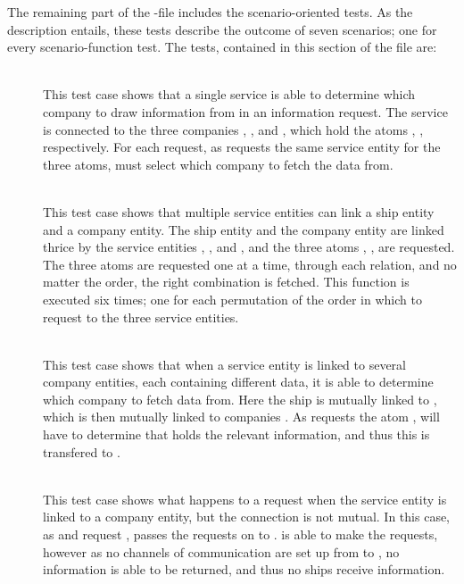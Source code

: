 The remaining part of the -file includes the scenario-oriented tests. As the description entails, these tests describe the outcome of seven scenarios; one for every scenario-function test. The tests, contained in this section of the file are:
\begin{description}
  \item[]\ \\
    This test case shows that a single service is able to determine which company to draw information from in an information request. The service  is connected to the three companies , , and , which hold the atoms , ,  respectively. For each request, as  requests the same service entity  for the three atoms,  must select which company to fetch the data from.
  \item[]\ \\
    This test case shows that multiple service entities can link a ship entity and a company entity. The ship entity  and the company entity  are linked thrice by the service entities , , and , and the three atoms , ,  are requested. The three atoms are requested one at a time, through each relation, and no matter the order, the right combination is fetched. This function is executed six times; one for each permutation of the order in which to request to the three service entities.
  \item[]\ \\
    This test case shows that when a service entity is linked to several company entities, each containing different data, it is able to determine which company to fetch data from. Here the ship  is mutually linked to , which is then mutually linked to companies \ttt{Com[1..5}. As  requests the atom ,  will have to determine that  holds the relevant information, and thus this is transfered to .
  \item[]\ \\
    This test case shows what happens to a request when the service entity is linked to a company entity, but the connection is not mutual. In this case, as  and  request ,  passes the requests on to .  is able to make the requests, however as no channels of communication are set up from  to , no information is able to be returned, and thus no ships receive information.

\end{description}

